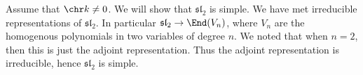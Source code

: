 Assume that $\chr k\neq 0$. We will show that $\mathfrak{sl}_2$ is simple.
We have met irreducible representations of $\mathfrak{sl}_2$. In particular
$\mathfrak{sl}_2\to \End(V_n)$, where $V_n$ are the homogenous polynomials in two
variables of degree $n$. We noted that when $n = 2$, then this is just the
adjoint representation. Thus the adjoint representation is irreducible, hence
$\mathfrak{sl}_2$ is simple.
